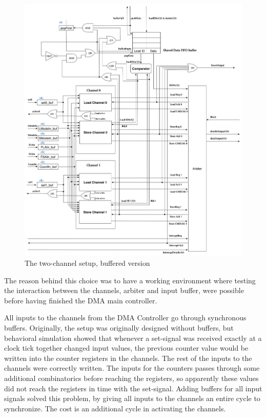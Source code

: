 \begin{appendix}
\begin{figure}[h!]
    \centering
    \includegraphics[width=1.1\textwidth]{Figures/DMA/TwoChannelSetUpBuffered}
    \caption{The two-channel setup, buffered version}
    \label{fig:twoChannelSetup}
\end{figure}

The reason behind this choice was to have a working environment where testing the interaction between the channels, arbiter and input buffer, were possible before having finished the DMA main controller.

All inputs to the channels from the DMA Controller go through synchronous buffers.
Originally, the setup was originally designed without buffers, but behavioral simulation showed that whenever a set-signal was received exactly at a clock tick together changed input values, the previous counter value would be written into the counter registers in the channels.
The rest of the inputs to the channels were correctly written.
The inputs for the counters passes through some additional combinatorics before reaching the registers, so apparently these values did not reach the registers in time with the set-signal.
Adding buffers for all input signals solved this problem, by giving all inputs to the channels an entire cycle to synchronize.
The cost is an additional cycle in activating the channels.


\end{appendix}
